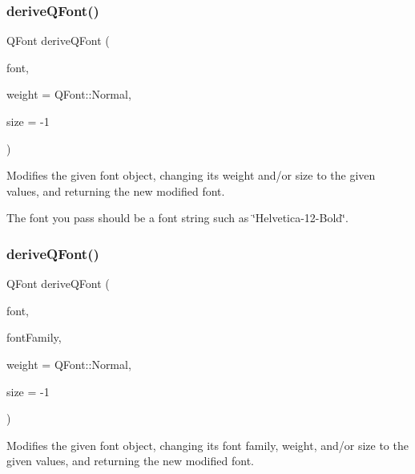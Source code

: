 \subsubsection{\texorpdfstring{derive\+Q\+Font()}{deriveQFont()}\hspace{0.1cm}{\footnotesize\ttfamily [3/4]}}
{\footnotesize\ttfamily Q\+Font derive\+Q\+Font (\begin{DoxyParamCaption}\item[{const std\+::string \&}]{font,  }\item[{Q\+Font\+::\+Weight}]{weight = {\ttfamily QFont\+:\+:Normal},  }\item[{int}]{size = {\ttfamily -\/1} }\end{DoxyParamCaption})\hspace{0.3cm}{\ttfamily [static]}}



Modifies the given font object, changing its weight and/or size to the given values, and returning the new modified font. 

The font you pass should be a font string such as \char`\"{}\+Helvetica-\/12-\/\+Bold\char`\"{}. \mbox{\label{classsgl_1_1GFont_a50c41ebc7de0a4a038852b0764d3a6f2}} 
\subsubsection{\texorpdfstring{derive\+Q\+Font()}{deriveQFont()}\hspace{0.1cm}{\footnotesize\ttfamily [4/4]}}
{\footnotesize\ttfamily Q\+Font derive\+Q\+Font (\begin{DoxyParamCaption}\item[{const std\+::string \&}]{font,  }\item[{const std\+::string \&}]{font\+Family,  }\item[{Q\+Font\+::\+Weight}]{weight = {\ttfamily QFont\+:\+:Normal},  }\item[{int}]{size = {\ttfamily -\/1} }\end{DoxyParamCaption})\hspace{0.3cm}{\ttfamily [static]}}



Modifies the given font object, changing its font family, weight, and/or size to the given values, and returning the new modified font. 

